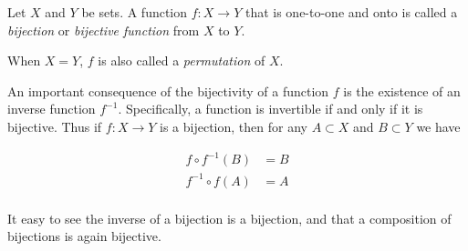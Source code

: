 \documentclass{article}
\begin{document}
Let $X$ and $Y$ be sets. A function $f\colon X\to Y$ that is one-to-one and onto is called a \emph{bijection} or \emph{bijective function} from $X$ to $Y$.

When $X=Y$, $f$ is also called a \emph{permutation} of $X$.

An important consequence of the bijectivity of a function $f$ is the existence of an inverse function $f^{-1}$.  Specifically, a function is invertible if and only if it is bijective.  Thus if $f:X\rightarrow Y$ is a bijection, then for any $A\subset X$ and $B\subset Y$ we have 

\begin{align*}
f\circ f^{-1}(B)&=B\\
f^{-1}\circ f(A)&=A\\
\end{align*}

It easy to see the inverse of a bijection is a bijection, and that a composition of bijections is again bijective.
\end{document}
